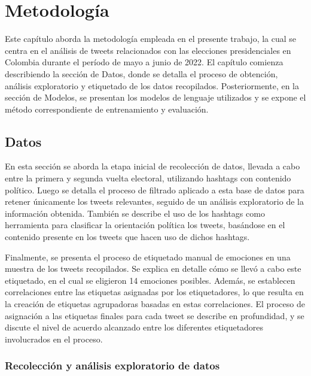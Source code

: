 \chapter{Metodología}


Este capítulo aborda la metodología empleada en el presente trabajo, la cual se centra en el análisis de tweets relacionados con las elecciones presidenciales en Colombia durante el período de mayo a junio de 2022. El capítulo comienza describiendo la sección de Datos, donde se detalla el proceso de obtención, análisis exploratorio y etiquetado de los datos recopilados. Posteriormente, en la sección de Modelos, se presentan los modelos de lenguaje utilizados y se expone el método correspondiente de entrenamiento y evaluación.

\section{Datos}

En esta sección se aborda la etapa inicial de recolección de datos, llevada a cabo entre la primera y segunda vuelta electoral, utilizando hashtags con contenido político. Luego se detalla el proceso de filtrado aplicado a esta base de datos para retener únicamente los tweets relevantes, seguido de un análisis exploratorio de la información obtenida. También se describe el uso de los hashtags como herramienta para clasificar la orientación política los tweets, basándose en el contenido presente en los tweets que hacen uso de dichos hashtags.

Finalmente, se presenta el proceso de etiquetado manual de emociones en una muestra de los tweets recopilados. Se explica en detalle cómo se llevó a cabo este etiquetado, en el cual se eligieron 14 emociones posibles. Además, se establecen correlaciones entre las etiquetas asignadas por los etiquetadores, lo que resulta en la creación de etiquetas agrupadoras basadas en estas correlaciones. El proceso de asignación a las etiquetas finales para cada tweet se describe en profundidad, y se discute el nivel de acuerdo alcanzado entre los diferentes etiquetadores involucrados en el proceso.



\subsection{Recolección y análisis exploratorio de datos}


